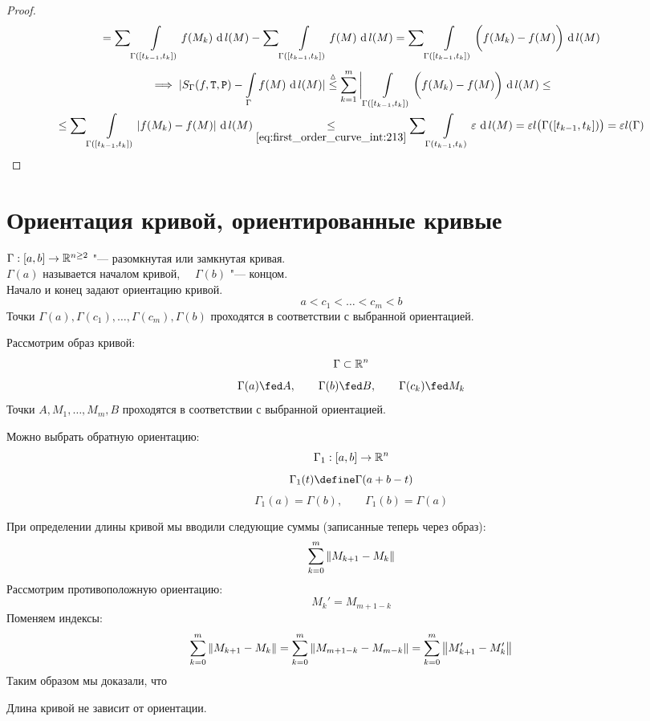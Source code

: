 \begin{proof}
\begin{multline*}
		= \sum \int\limits_{\Gamma([t_{k - 1}, t_k])} {f(M_k)} \, \operatorname{d} {l(M)} - \sum \int\limits_{\Gamma([t_{k - 1}, t_k])} {f(M)} \, \operatorname{d} {l(M)} = \sum \int\limits_{\Gamma([t_{k - 1}, t_k])} { \bigg( f(M_k) - f(M) \bigg)} \, \operatorname{d} {l(M)}
	\end{multline*}
	\begin{multline*}
		\implies |S_\Gamma(f, \Teq, \Par) - \cint\Gamma{f(M)}| \trile \sum_{k = 1}^m \bigg| \cint{\Gamma([t_{k - 1}, t_k])}{\bigg( f(M_k) - f(M) \bigg)} \le \\
		\le \sum \cint{\Gamma([t_{k - 1}, t_k])}{|f(M_k) - f(M)|} \underset{\eref{first_order_curve_int:213}}\le \sum \cint{\Gamma(t_{k - 1}, t_k)}\veps = \veps l \big( \Gamma([t_{k - 1}, t_k]) \big) = \veps l(\Gamma)
	\end{multline*}
\end{proof}

\section{Ориентация кривой, ориентированные кривые}

\begin{definition}
	$ \Gamma : [a, b] \to \mathbb{R}^{n \ge 2} $ "--- разомкнутая или замкнутая кривая. \\
	$ \Gamma(a) $ называется началом кривой, $ \quad \Gamma(b) $ "--- концом. \\
	Начало и конец задают ориентацию кривой.
	$$ a < c_1 < \dots < c_m < b $$
	Точки $ \Gamma(a), \Gamma(c_1), \dots, \Gamma(c_m), \Gamma(b) $ проходятся в соответствии с выбранной ориентацией.
\end{definition}

Рассмотрим образ кривой:
$$ \Gamma \subset \mathbb{R}^n $$
$$ \Gamma(a) \fed A, \qquad \Gamma(b) \fed B, \qquad \Gamma(c_k) \fed M_k $$
Точки $ A, M_1, \dots, M_m, B $ проходятся в соответствии с выбранной ориентацией.

Можно выбрать \soc обратную ориентацию:
$$ \Gamma_1 : [a, b] \to \mathbb{R}^n $$
$$ \Gamma_1(t) \define \Gamma(a + b - t) $$
$$ \Gamma_1(a) = \Gamma(b), \qquad \Gamma_1(b) = \Gamma(a) $$

При определении длины кривой мы вводили следующие суммы (записанные теперь через образ):
$$ \sum_{k = 0}^m \left\|{M_{k + 1} - M_k}\right\| $$
Рассмотрим противоположную ориентацию:
$$ M_k' = M_{m + 1 - k} $$
Поменяем индексы:
$$ \sum_{k = 0}^m \left\|{M_{k + 1} - M_k}\right\| = \sum_{k = 0}^m \left\|{M_{m + 1 - k} - M_{m - k}}\right\| = \sum_{k = 0}^m \left\|{M_{k + 1}' - M_k'}\right\| $$
Таким образом мы доказали, что

\begin{statement}
	Длина кривой не зависит от ориентации.
\end{statement}

